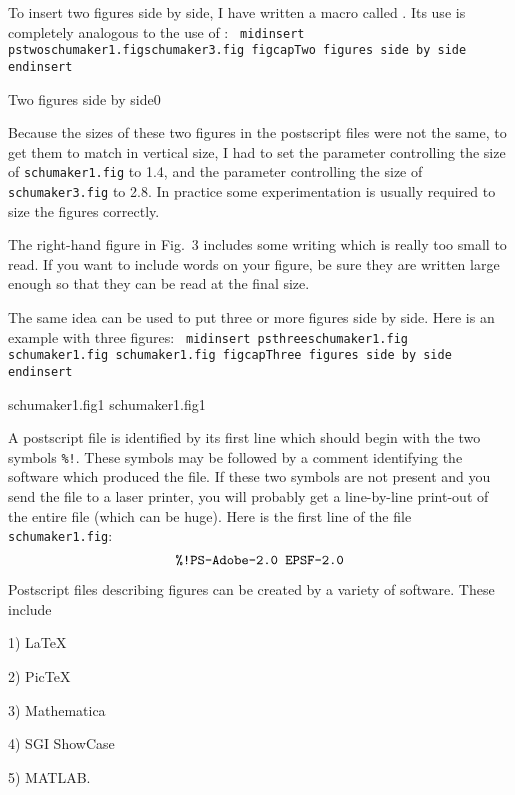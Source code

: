 To insert two figures side by side, I have written a macro called
. Its use is
completely analogous to the use of :
\medskip
{\obeylines \tt
\back midinsert
\back pstwo\lc schumaker1.fig\rc {}\rc \lc schumaker3.fig\rc {}\rc
\back figcap\rc \lc Two figures side by side\rc{}\rc
\back endinsert
}
\medskip

\midinsert
{}%
 {Two figures side by side}{0}
\endinsert

Because the sizes of these two figures in the postscript files
were not the same,
to get them to match in vertical size, I had to set the
parameter controlling the size of  {\tt schumaker1.fig}
to 1.4, and the parameter controlling the size of {\tt schumaker3.fig}
to 2.8. In practice some experimentation is usually required to size
the figures correctly.

The right-hand figure in Fig.~3 includes some writing which is really
too small to read.  If you want to include words on your figure,
be sure they are written large enough so that they can be read
at the final size.

The same idea can be used to put three or more figures side by side.
Here is an example with three figures:
\medskip
{\obeylines \tt
\back midinsert
\back psthree\lc schumaker1.fig\rc{}\rc
  \lc schumaker1.fig\rc{}\rc
  \lc schumaker1.fig\rc{}\rc
  \back figcap\rc\lc Three figures side by side\rc{}\rc
  \back  endinsert
}

\midinsert
{}
     {schumaker1.fig}{1}
     {schumaker1.fig}{1}
\endinsert

{}
A postscript file is identified by its first line which should
begin with the two symbols {\tt \%!}.  These symbols may be followed by a
comment identifying the software which produced the file.  If these two symbols
are not present and you send the file to a laser printer, you will
probably get a line-by-line print-out of the entire file (which can
be huge). Here is the first line of the file {\tt schumaker1.fig}:
\ms
$$\hbox{\tt \%!PS-Adobe-2.0 EPSF-2.0} $$
\ms

\noindent Postscript files describing figures can be created by a variety of
software. These include
\sm
\item{1)} La\TeX
\item{2)} Pic\TeX
\item{3)} Mathematica
\item{4)} SGI ShowCase
\item{5)} MATLAB.
\sm

